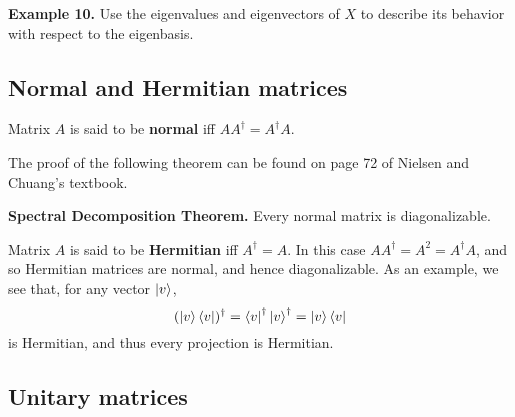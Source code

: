 \documentclass [12pt]{article}
\theoremstyle{definition}
\begin{document}
\newpage
\textbf{Example 10.}  Use the eigenvalues and eigenvectors of $X$ to describe its behavior with respect to the eigenbasis.

\newpage
\vspace{3.0in}
\subsection*{Normal and Hermitian matrices}
Matrix $A$ is said to be \textbf{normal} iff $AA^{\dagger} = A^{\dagger}A$. 

The proof of the following theorem can be found on page 72 of Nielsen and Chuang's textbook.

\textbf{Spectral Decomposition Theorem.} Every normal matrix is diagonalizable.

Matrix $A$ is said to be \textbf{Hermitian} iff $A^{\dagger} = A$. In this case $AA^{\dagger} = A^2 =  A^{\dagger}A$, and so Hermitian matrices are normal, and hence
diagonalizable. As an example, we see that, for any vector $\ket{v}$,
\[(\ket{v}\bra{v})^{\dagger} = \bra{v}^{\dagger}\ket{v}^{\dagger} = \ket{v}\bra{v}\]
is Hermitian, and thus every projection is Hermitian. 



 
\subsection*{Unitary matrices}
\end{document}
